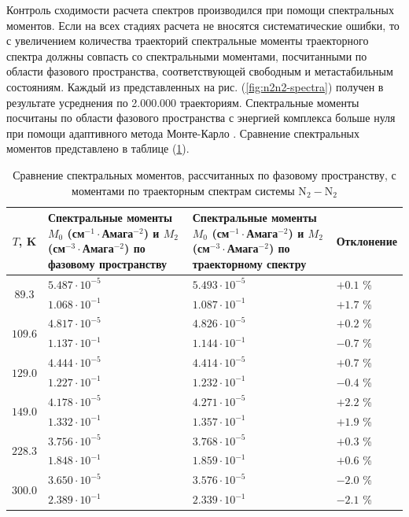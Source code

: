 Контроль сходимости расчета спектров производился при помощи спектральных моментов. Если на всех стадиях расчета не вносятся систематические ошибки, то с увеличением количества траекторий спектральные моменты траекторного спектра должны совпасть со спектральными моментами, посчитанными по области фазового пространства, соответствующей свободным и метастабильным состояниям. Каждый из представленных на рис. (\ref{fig:n2n2-spectra}) получен в результате усреднения по 2.000.000 траекториям. Спектральные моменты посчитаны по области фазового пространства с энергией комплекса больше нуля при помощи адаптивного метода Монте-Карло \cite{hep}. Сравнение спектральных моментов представлено в таблице (\ref{table:n2n2-moments}).

\begin{table}[H]
    \begin{tabular}{c >{\centering}p{6cm} >{\centering}p{6cm} >{\centering}p{3cm}}
        \toprule
        $T$, K & Спектральные моменты $M_0$ (см$^{-1} \cdot$Амага$^{-2}$) и $M_2$ (см$^{-3} \cdot$Амага$^{-2}$) по фазовому пространству & Спектральные моменты $M_0$ (см$^{-1} \cdot$Амага$^{-2}$) и $M_2$ (см$^{-3} \cdot$Амага$^{-2}$) по траекторному спектру & Отклонение \tabularnewline
        \midrule
        \multirow{2}{*}{$89.3$}  & $5.487\cdot 10^{-5}$ & $5.493 \cdot 10^{-5}$ & $+0.1$ \%  \tabularnewline
                                 & $1.068\cdot 10^{-1}$ & $1.087 \cdot 10^{-1}$ & $+1.7$ \%  \tabularnewline
        \midrule
        \multirow{2}{*}{$109.6$} & $4.817\cdot 10^{-5}$ & $4.826 \cdot 10^{-5}$ & $+0.2$ \%  \tabularnewline
                                 & $1.137\cdot 10^{-1}$ & $1.144 \cdot 10^{-1}$ & $-0.7$ \%  \tabularnewline
        \midrule
        \multirow{2}{*}{$129.0$} & $4.444\cdot 10^{-5}$ & $4.414 \cdot 10^{-5}$ & $+0.7$ \%  \tabularnewline
                                 & $1.227\cdot 10^{-1}$ & $1.232 \cdot 10^{-1}$ & $-0.4$ \%  \tabularnewline
        \midrule
        \multirow{2}{*}{$149.0$} & $4.178\cdot 10^{-5}$ & $4.271 \cdot 10^{-5}$ & $+2.2$ \%  \tabularnewline
                                 & $1.332\cdot 10^{-1}$ & $1.357 \cdot 10^{-1}$ & $+1.9$ \%  \tabularnewline
        \midrule
        \multirow{2}{*}{$228.3$} & $3.756\cdot 10^{-5}$ & $3.768 \cdot 10^{-5}$ & $+0.3$ \%  \tabularnewline
                                 & $1.848\cdot 10^{-1}$ & $1.859 \cdot 10^{-1}$ & $+0.6$ \%  \tabularnewline
        \midrule
        \multirow{2}{*}{$300.0$} & $3.650\cdot 10^{-5}$ & $3.576 \cdot 10^{-5}$ & $-2.0$ \%  \tabularnewline
                                 & $2.389\cdot 10^{-1}$ & $2.339 \cdot 10^{-1}$ & $-2.1$ \%  \tabularnewline
        \bottomrule
    \end{tabular}
    \caption{Сравнение спектральных моментов, рассчитанных по фазовому пространству, с моментами по траекторным спектрам системы N$_2-$N$_2$}
    \label{table:n2n2-moments}
\end{table}

